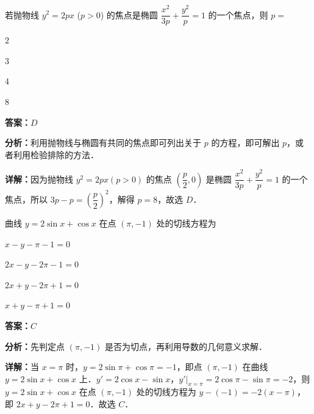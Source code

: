 \begin{question}[points=5]
若抛物线 $y^2=2px$ ($p>0$) 的焦点是椭圆 $\dfrac{x^2}{3p}+\dfrac{y^2}{p}=1$ 的一个焦点，则 $p=$
\begin{choices}
  \item $2$
  \item $3$
  \item $4$
  \item $8$
\end{choices}
\begin{solution}
\textbf{答案：}$D$

\textbf{分析：}利用抛物线与椭圆有共同的焦点即可列出关于 $p$ 的方程，即可解出 $p$，或者利用检验排除的方法．

\textbf{详解：}因为抛物线 $y^2=2px(p>0)$ 的焦点 $\left(\dfrac{p}{2},0\right)$ 是椭圆 $\dfrac{x^2}{3p}+\dfrac{y^2}{p}=1$ 的一个焦点，所以 $3p-p=\left(\dfrac{p}{2}\right)^2$，解得 $p=8$，故选 $D$．
\end{solution}
\end{question}

\begin{question}[points=5]
曲线 $y=2\sin x+\cos x$ 在点 $(\pi,-1)$ 处的切线方程为
\begin{choices}
  \item $x-y-\pi-1=0$
  \item $2x-y-2\pi-1=0$
  \item $2x+y-2\pi+1=0$
  \item $x+y-\pi+1=0$
\end{choices}
\begin{solution}
\textbf{答案：}$C$

\textbf{分析：}先判定点 $(\pi,-1)$ 是否为切点，再利用导数的几何意义求解．

\textbf{详解：}当 $x=\pi$ 时，$y=2\sin\pi+\cos\pi=-1$，即点 $(\pi,-1)$ 在曲线 $y=2\sin x+\cos x$ 上．$y'=2\cos x-\sin x$，$y'|_{x=\pi}=2\cos\pi-\sin\pi=-2$，则 $y=2\sin x+\cos x$ 在点 $(\pi,-1)$ 处的切线方程为 $y-(-1)=-2(x-\pi)$，即 $2x+y-2\pi+1=0$．故选 $C$．
\end{solution}
\end{question}

